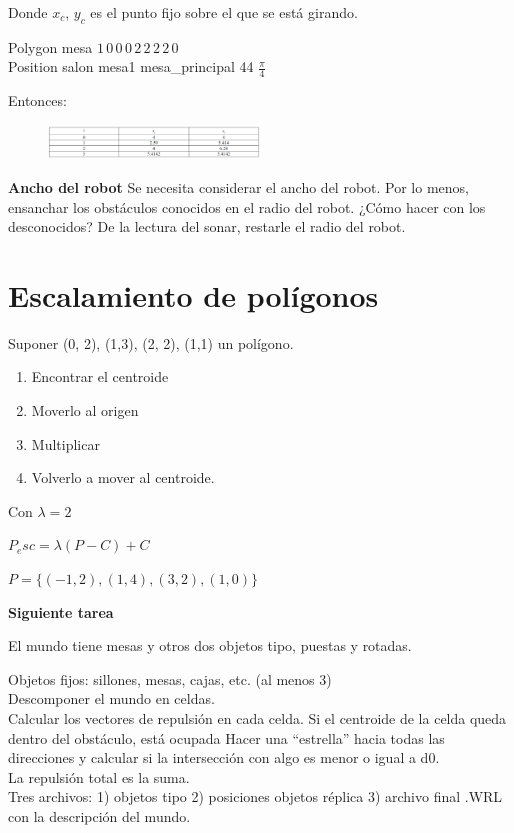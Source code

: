 Donde $x_c$, $y_c$ es el punto fijo sobre el que se está girando.

\begin{ejemplo}
	Polygon mesa $1 \, 0 \, 0\, 0\, 2\, 2\, 2\, 2\, 0$ \\	
	Position salon mesa1 mesa\_principal 44 $\frac{\pi}{4}$
\end{ejemplo}

Entonces:

\begin{figure}[h!]
	\centering
	\includegraphics[width=0.5\textwidth]{images/img69.png}
	\label{figura69}
\end{figure}

\textbf{Ancho del robot}
Se necesita considerar el ancho del robot. Por lo menos, ensanchar los obstáculos conocidos en el radio del
robot.
¿Cómo hacer con los desconocidos? De la lectura del sonar, restarle el radio del robot.

\section{Escalamiento de polígonos}

Suponer (0, 2), (1,3), (2, 2), (1,1) un polígono.


\begin{enumerate}[1.]
	\item Encontrar el centroide
	\item Moverlo al origen
	\item Multiplicar
	\item Volverlo a mover al centroide.
\end{enumerate}


Con $\lambda =2$


$P_esc = \lambda (P - C) + C$

$P = \{(-1,2),(1,4),(3,2),(1,0)\}$

\begin{scaja}
	\textbf{Siguiente tarea}
	
	El mundo tiene mesas y otros dos objetos tipo, puestas y rotadas.
	
	Objetos fijos: sillones, mesas, cajas, etc. (al menos 3)
	\\
	
	Descomponer el mundo en celdas.
	\\
	
	Calcular los vectores de repulsión en cada celda.
	Si el centroide de la celda queda dentro del obstáculo, está ocupada
	Hacer una “estrella” hacia todas las direcciones y calcular si la intersección con algo es menor o igual a d0.
	\\
	La repulsión total es la suma.
	\\	
	
	Tres archivos: 1) objetos tipo 2) posiciones objetos réplica 3) archivo final .WRL con la descripción del
	mundo.
\end{scaja}

